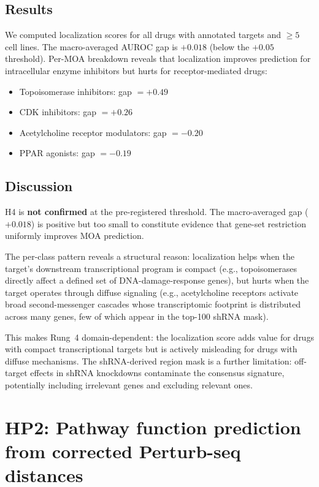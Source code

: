 \documentclass[11pt]{article}
\begin{document}
\subsection{Results}

We computed localization scores for all drugs with annotated targets
and $\geq 5$ cell lines.  The macro-averaged AUROC gap is $+0.018$
(below the $+0.05$ threshold).  Per-MOA breakdown reveals that
localization improves prediction for intracellular enzyme inhibitors
but hurts for receptor-mediated drugs:

\begin{itemize}
\item Topoisomerase inhibitors: gap $= +0.49$
\item CDK inhibitors: gap $= +0.26$
\item Acetylcholine receptor modulators: gap $= -0.20$
\item PPAR agonists: gap $= -0.19$
\end{itemize}

\subsection{Discussion}

H4 is \textbf{not confirmed} at the pre-registered threshold.
The macro-averaged gap ($+0.018$) is positive but too small to
constitute evidence that gene-set restriction uniformly improves MOA
prediction.

The per-class pattern reveals a structural reason: localization helps
when the target's downstream transcriptional program is compact (e.g.,
topoisomerases directly affect a defined set of DNA-damage-response
genes), but hurts when the target operates through diffuse signaling
(e.g., acetylcholine receptors activate broad second-messenger
cascades whose transcriptomic footprint is distributed across many
genes, few of which appear in the top-100 shRNA mask).

This makes Rung~4 domain-dependent: the localization score adds value
for drugs with compact transcriptional targets but is actively
misleading for drugs with diffuse mechanisms.  The shRNA-derived region
mask is a further limitation: off-target effects in shRNA knockdowns
contaminate the consensus signature, potentially including irrelevant
genes and excluding relevant ones.

\section{HP2: Pathway function prediction from corrected Perturb-seq distances}
\label{sec:hp2}
\end{document}
